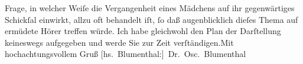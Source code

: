 \begin{ledgroupsized}[t]{13cm}
               Frage, in welcher Weiſe die Vergangenheit eines Mädchens auf ihr gegenwärtiges
               Schickſal einwirkt, allzu oft behandelt iſt, ſo daß augenblicklich dieſes Thema auf
               ermüdete Hörer treffen würde. Ich habe gleichwohl den Plan der Darſtellung keineswegs
               aufgegeben und werde Sie zur Zeit verſtändigen.\hspace*{2.5em}Mit
               hochachtungsvollem Gruß\pend
           \pstart \spacefill\mbox{{[}hs. Blumenthal:{]} Dr. Osc. Blumenthal}\pend{}
         
         \endnumbering{}\end{ledgroupsized}  \newcommand{\dateiname}{L00253}\newcommand{\titel}{Oscar Blumenthal an Arthur Schnitzler, 12. 8. 1893}\newcommand{\editorInnen}{Martin Anton Müller und Gerd-Hermann Susen}
      